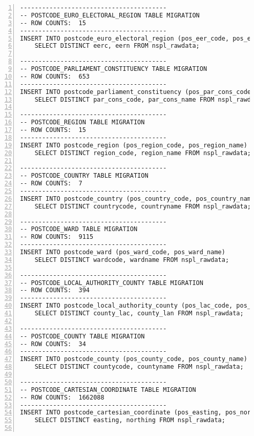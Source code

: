 \begin{lstlisting}[breaklines, frame=single, numbers=left, caption={PL/pgSQL's DML Script for Postcode Normalized Database Migration.}, label=commandline-02]
----------------------------------------
-- POSTCODE_EURO_ELECTORAL_REGION TABLE MIGRATION 
-- ROW COUNTS:  15
----------------------------------------
INSERT INTO postcode_euro_electoral_region (pos_eer_code, pos_eer_name)
	SELECT DISTINCT eerc, eern FROM nspl_rawdata;

----------------------------------------
-- POSTCODE_PARLIAMENT_CONSTITUENCY TABLE MIGRATION 
-- ROW COUNTS:  653
----------------------------------------
INSERT INTO postcode_parliament_constituency (pos_par_cons_code, pos_par_cons_name)
	SELECT DISTINCT par_cons_code, par_cons_name FROM nspl_rawdata;

----------------------------------------
-- POSTCODE_REGION TABLE MIGRATION 
-- ROW COUNTS:  15
----------------------------------------
INSERT INTO postcode_region (pos_region_code, pos_region_name)
	SELECT DISTINCT region_code, region_name FROM nspl_rawdata;

----------------------------------------
-- POSTCODE_COUNTRY TABLE MIGRATION 
-- ROW COUNTS:  7
----------------------------------------
INSERT INTO postcode_country (pos_country_code, pos_country_name)
	SELECT DISTINCT countrycode, countryname FROM nspl_rawdata;

----------------------------------------
-- POSTCODE_WARD TABLE MIGRATION 
-- ROW COUNTS:  9115
----------------------------------------
INSERT INTO postcode_ward (pos_ward_code, pos_ward_name)
	SELECT DISTINCT wardcode, wardname FROM nspl_rawdata;

----------------------------------------
-- POSTCODE_LOCAL_AUTHORITY_COUNTY TABLE MIGRATION 
-- ROW COUNTS:  394
----------------------------------------
INSERT INTO postcode_local_authority_county (pos_lac_code, pos_lac_name)
	SELECT DISTINCT county_lac, county_lan FROM nspl_rawdata;

----------------------------------------
-- POSTCODE_COUNTY TABLE MIGRATION 
-- ROW COUNTS:  34
----------------------------------------
INSERT INTO postcode_county (pos_county_code, pos_county_name)
	SELECT DISTINCT countycode, countyname FROM nspl_rawdata;

----------------------------------------
-- POSTCODE_CARTESIAN_COORDINATE TABLE MIGRATION 
-- ROW COUNTS:  1662088
----------------------------------------
INSERT INTO postcode_cartesian_coordinate (pos_easting, pos_northing)
	SELECT DISTINCT easting, northing FROM nspl_rawdata;


\end{lstlisting}
